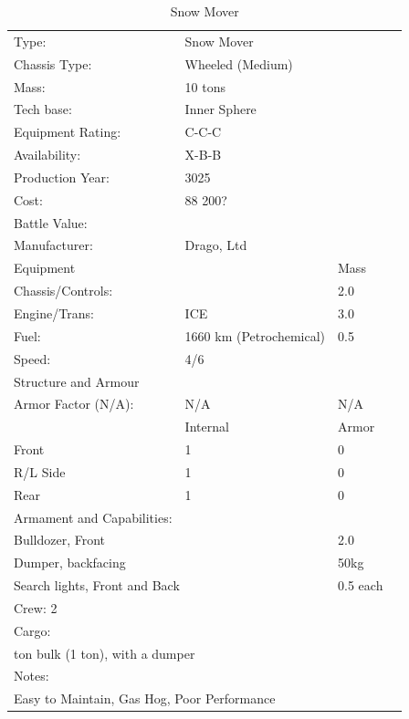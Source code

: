 \documentclass{tufte-book}
\begin{document}
\bigskip
\begin{table}
  \begin{minipage}{\textwidth}
    \begin{center}
      \begin{tabular}{llll}
        \toprule
        Type: & Snow Mover & \\
        Chassis Type: & Wheeled (Medium) & \\
        Mass: & 10 tons & \\
        Tech base: & Inner Sphere & \\
        Equipment Rating: & C-C-C & \\
        Availability: & X-B-B & \\
        Production Year: & 3025 & \\
        Cost: & 88 200? & \\
        Battle Value: & & \\
        Manufacturer: & Drago, Ltd & \\
        Equipment & & Mass \\
        \quad Chassis/Controls: & & 2.0 \\
        \quad Engine/Trans: & ICE  & 3.0 \\
        \quad Fuel: & 1660 km (Petrochemical) & 0.5 \\
        \quad Speed: & \multicolumn{2}{l}{4/6} \\
        Structure and Armour & & \\
        \quad Armor Factor (N/A): & N/A & N/A \\
        \quad & Internal & Armor \\
        \quad Front & 1 & 0 \\
        \quad R/L Side & 1 & 0 \\
        \quad Rear & 1 & 0 \\
        Armament and Capabilities: & & \\
        \multicolumn{2}{l}{\quad Bulldozer, Front} & 2.0 \\
        \multicolumn{2}{l}{\quad Dumper, backfacing} & 50kg \\
        \multicolumn{2}{l}{\quad 2 Search lights, Front and Back} & 0.5 each \\

        \multicolumn{3}{l}{Crew: 2} \\
        Cargo: & & \\
        \multicolumn{3}{l}{\quad 1 ton bulk (1 ton), with a dumper} \\

        Notes: & & \\
        \multicolumn{3}{l}{\quad Easy to Maintain, Gas Hog, Poor Performance} \\
        \bottomrule
      \end{tabular}
    \end{center}
  \end{minipage}
  \caption{Snow Mover}
\end{table}
\end{document}
